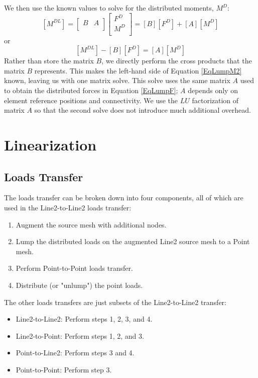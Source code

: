 \documentclass[10pt,letterpaper,oneside,notitlepage]{article}
\begin{document}
We then use the known values to solve for the distributed moments, $M^D$:
\begin{equation}
\label{EqLumpM1}
	\left[	M^{DL} \right]
=
	\begin{bmatrix} B & A \\	\end{bmatrix}
	\begin{bmatrix}
	F^{D} \\
	M^{D} \\
	\end{bmatrix}
= \left[	B \right] \left[	F^D \right] + \left[	A \right] \left[	M^D \right] 
\end{equation}
or
\begin{equation}
\label{EqLumpM2}
\left[	M^{DL} \right] - \left[	B \right] \left[	F^D \right] = \left[	A \right] \left[	M^D \right]
\end{equation}
Rather than store the matrix $B$, we directly perform the cross products that the matrix $B$ represents.
This makes the left-hand side of Equation \ref{EqLumpM2} known, leaving us with one matrix solve. This 
solve uses the same matrix $A$ used to obtain the distributed forces in Equation \ref{EqLumpF}; $A$ depends 
only on element reference positions and connectivity. We use 
the $LU$ factorization of matrix $A$ so that the second solve does not introduce much additional overhead.


\section {Linearization}
\subsection{Loads Transfer}
The loads transfer can be broken down into four components, all of which are used in the Line2-to-Line2 loads transfer:
\begin{enumerate}
  \item Augment the source mesh with additional nodes.
  \item Lump the distributed loads on the augmented Line2 source mesh to a Point mesh.
  \item Perform Point-to-Point loads transfer.
  \item Distribute (or "unlump") the point loads.	
\end{enumerate}
The other loads transfers are just subsets of the Line2-to-Line2 transfer:
\begin{itemize}
  \item Line2-to-Line2: Perform steps 1, 2, 3, and 4.
  \item Line2-to-Point: Perform steps 1, 2, and 3.
  \item Point-to-Line2: Perform steps 3 and 4.
  \item Point-to-Point: Perform step 3.
\end{itemize}
\end{document}
